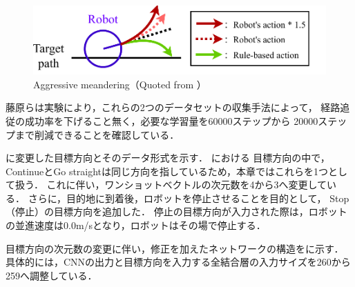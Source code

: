 \begin{figure}[htbp]
    \centering
     \includegraphics[width=130mm]{images/pdf/dakou.pdf}
     \caption[Aggressive meandering]{Aggressive meandering（Quoted from \cite{fujiwara2023}）}\label{fig:dakou}
\end{figure}
藤原らは実験により，これらの2つのデータセットの収集手法によって，
経路追従の成功率を下げること無く，必要な学習量を60000ステップから
20000ステップまで削減できることを確認している．
\newpage

に変更した目標方向とそのデータ形式を示す．
における
目標方向の中で，ContinueとGo straightは同じ方向を指しているため，本章ではこれらを1つとして扱う．
これに伴い，ワンショットベクトルの次元数を4から3へ変更している．
さらに，目的地に到着後，ロボットを停止させることを目的として，
Stop（停止）の目標方向を追加した．
停止の目標方向が入力された際は，ロボットの並進速度は0.0m/sとなり，ロボットはその場で停止する．

目標方向の次元数の変更に伴い，修正を加えたネットワークの構造をに示す．
具体的には，CNNの出力と目標方向を入力する全結合層の入力サイズを260から259へ調整している．

